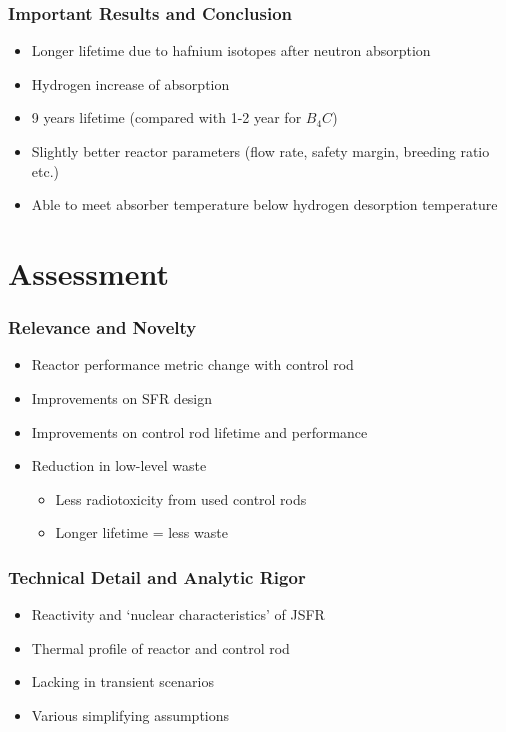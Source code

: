 \documentclass[9pt]{beamer}
\newcommand{\bc}{$B_4C$\xspace}
\begin{document}
\begin{frame}
\frametitle{Important Results and Conclusion}
\begin{itemize}
  \item Longer lifetime due to hafnium isotopes after neutron absorption
  \item Hydrogen increase of absorption
  \item 9 years lifetime (compared with 1-2 year for \bc)
  \item Slightly better reactor parameters (flow rate, safety margin, breeding ratio etc.)
  \item Able to meet absorber temperature below hydrogen desorption temperature
\end{itemize}
\end{frame}

\section{Assessment}


\begin{frame}
\frametitle{Relevance and Novelty}
\begin{itemize}
  \item Reactor performance metric change with control rod
  \item Improvements on \gls{SFR} design
  \item Improvements on control rod lifetime and performance
  \item Reduction in low-level waste
    \begin{itemize}
        \item Less radiotoxicity from used control rods
        \item Longer lifetime = less waste
    \end{itemize}
\end{itemize}
\end{frame}

\begin{frame}
\frametitle{Technical Detail and Analytic Rigor}
\begin{itemize}
    \item Reactivity and `nuclear characteristics' of \gls{JSFR}
    \item Thermal profile of reactor and control rod
    \item Lacking in transient scenarios
    \item Various simplifying assumptions
\end{itemize}
\end{frame}
\end{document}
